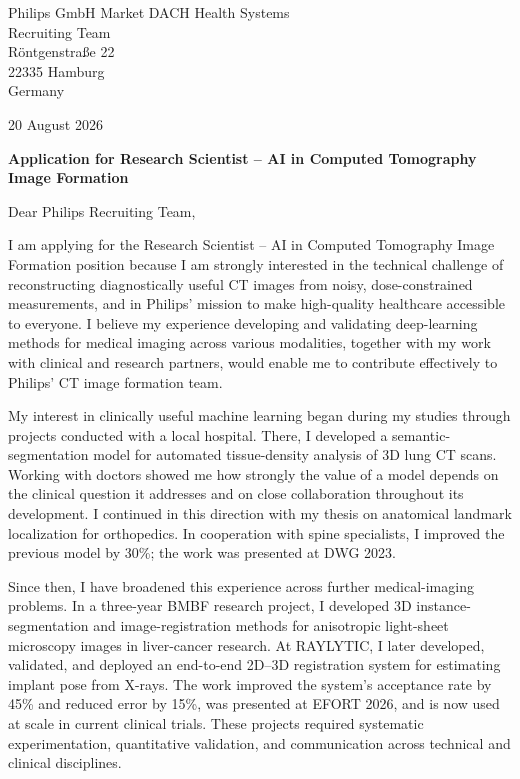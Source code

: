 \documentclass[11pt,a4paper]{article}
\begin{document}
Philips GmbH Market DACH Health Systems\\
Recruiting Team\\
R\"ontgenstra{\ss}e 22\\
22335 Hamburg\\
Germany

\begin{flushright}
20 August 2026
\end{flushright}

\textbf{Application for Research Scientist -- AI in Computed Tomography Image Formation}

Dear Philips Recruiting Team,

I am applying for the Research Scientist -- AI in Computed Tomography Image Formation position because I am strongly interested in the technical challenge of reconstructing diagnostically useful CT images from noisy, dose-constrained measurements, and in Philips' mission to make high-quality healthcare accessible to everyone. I believe my experience developing and validating deep-learning methods for medical imaging across various modalities, together with my work with clinical and research partners, would enable me to contribute effectively to Philips' CT image formation team.

My interest in clinically useful machine learning began during my studies through projects conducted with a local hospital. There, I developed a semantic-segmentation model for automated tissue-density analysis of 3D lung CT scans. Working with doctors showed me how strongly the value of a model depends on the clinical question it addresses and on close collaboration throughout its development. I continued in this direction with my thesis on anatomical landmark localization for orthopedics. In cooperation with spine specialists, I improved the previous model by 30\%; the work was presented at DWG 2023.

Since then, I have broadened this experience across further medical-imaging problems. In a three-year BMBF research project, I developed 3D instance-segmentation and image-registration methods for anisotropic light-sheet microscopy images in liver-cancer research. At RAYLYTIC, I later developed, validated, and deployed an end-to-end 2D--3D registration system for estimating implant pose from X-rays. The work improved the system's acceptance rate by 45\% and reduced error by 15\%, was presented at EFORT 2026, and is now used at scale in current clinical trials. These projects required systematic experimentation, quantitative validation, and communication across technical and clinical disciplines.
\end{document}
